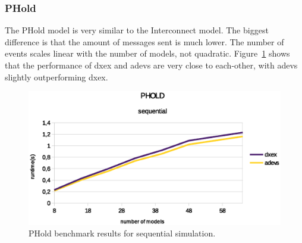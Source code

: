 \subsubsection{PHold}
\label{4-seq-PHold}
The PHold model is very similar to the Interconnect model.
The biggest difference is that the amount of messages sent is much lower.
The number of events scales linear with the number of models, not quadratic.
Figure~\ref{fig:Phold_benchmark} shows that the performance of dxex and adevs are very close to each-other, with adevs slightly outperforming dxex.
\begin{figure}
	\center
	\includegraphics[width=\plotfraction\columnwidth]{fig/phold_sequential.eps}
	\caption{PHold benchmark results for sequential simulation.}
	\label{fig:Phold_benchmark}
\end{figure}
